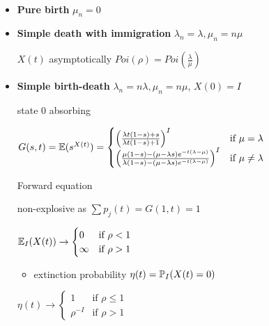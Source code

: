 \begin{example}\,
    \begin{itemize}
        \item \textbf{Pure birth} $\mu_n = 0$
        \item \textbf{Simple death with immigration} $\lambda_n = \lambda, \mu_n = n\mu$
        \begin{thm}
            $X(t)$ asymptotically $Poi(\rho) = Poi\left(\frac{\lambda}{\mu}\right)$
        \end{thm}
        \item \textbf{Simple birth-death} $\lambda_n = n\lambda, \mu_n = n\mu$, $X(0) = I$
        \begin{fact}
            state 0 absorbing
        \end{fact}
        \begin{thm}
            $G(s, t) = \mathbb{E}(s^{X(t)}) =
            \begin{cases}
                \left( \frac{\lambda t(1 - s) + s}{\lambda t (1 - s) + 1}   \right) ^I & \text{if } \mu = \lambda\\
                \left( \frac{\mu(1 - s) - (\mu - \lambda s)e^{-t(\lambda - \mu)}}{\lambda(1 - s) - (\mu - \lambda s)e^{-t(\lambda - \mu)}}   \right) ^I & \text{if } \mu \neq \lambda\\
            \end{cases}$
        \end{thm}
        \begin{pf}
            Forward equation
        \end{pf}
        \begin{fact}
            non-explosive as $\sum p_j(t) = G(1, t) = 1$
        \end{fact}
        \begin{fact}
            $\mathbb{E}_I(X(t)) \rightarrow
            \begin{cases}
                0 & \text{if } \rho < 1\\
                \infty & \text{if } \rho > 1\\
            \end{cases}$
        \end{fact}
        \begin{itemize}
            \item extinction probability $\eta(t) = \mathbb{P}_I(X(t) = 0)$
        \end{itemize}
        \begin{cor}
            $\eta(t) \rightarrow
            \begin{cases}
                1 & \text{if } \rho \leq 1\\
                \rho^{-I} & \text{if } \rho > 1
            \end{cases}$
        \end{cor}
    \end{itemize}
\end{example}


